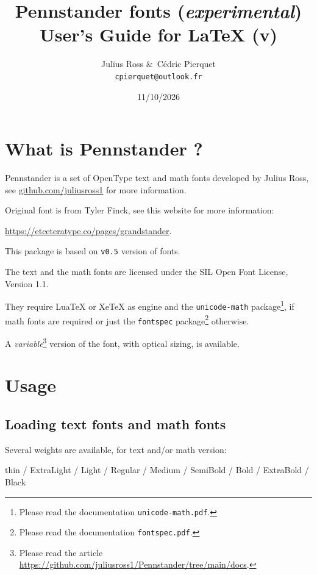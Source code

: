 \documentclass[a4paper]{scrartcl}
\date{11/10/2026}
\title{Pennstander fonts (\textit{experimental}) \\User’s Guide for LaTeX (v\version)}
\author{Julius Ross \&\ Cédric Pierquet \\ \texttt{cpierquet@outlook.fr}}
\newcommand*{\pkg}[1]{\texttt{#1}}
\newcommand*{\file}[1]{\texttt{#1}}
\newcommand*{\version}{0.5}
\begin{document}
\maketitle

\bigskip

\section{What is Pennstander ?}

Pennstander is a set of OpenType text and math fonts developed by Julius Ross, see \url{github.com/juliusross1} for more information.


Original font is from Tyler Finck, see this website for more information:

\url{https://etceteratype.co/pages/grandstander}.

\smallskip

This package is based on \texttt{v\version} version of fonts.

The text and the math fonts are licensed under the SIL Open Font License, Version 1.1.

They require LuaTeX or XeTeX as engine and the \pkg{unicode-math} package\footnote{Please read the documentation \file{unicode-math.pdf}.}, if math fonts are required or just the \pkg{fontspec} package\footnote{Please read the documentation \file{fontspec.pdf}.} otherwise.

\smallskip

A \textit{variable}\footnote{Please read the article \url{https://github.com/juliusross1/Pennstander/tree/main/docs}.} version of the font, with optical sizing, is available.

\pagebreak

\section{Usage}

\subsection{Loading text fonts and math fonts}

Several weights are available, for text and/or math version:

{\small \hfill{\pennstanderthin thin} / {\pennstanderextralight ExtraLight} / {\pennstanderlight Light} / {\pennstander Regular} / {\pennstandermedium Medium} / {\pennstandersemibold SemiBold} / {\pennstanderbold Bold} / {\pennstanderextrabold ExtraBold} / {\pennstanderblack Black}\hfill\null}
\end{document}
